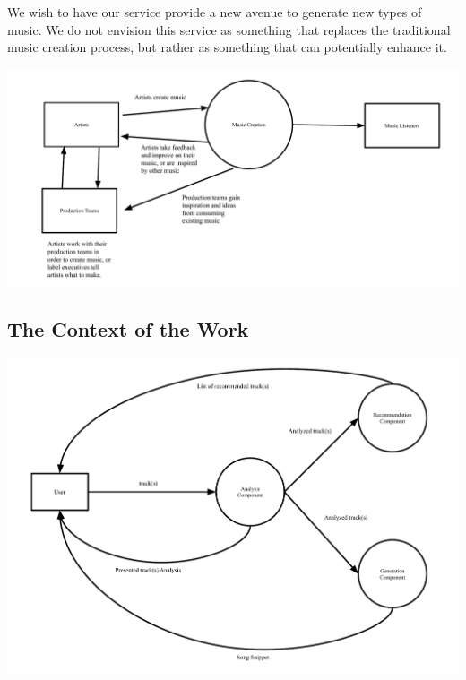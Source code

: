 \documentclass[12pt]{article}
\begin{document}
\begin{itemize}
  We wish to have our service provide a new avenue to generate new types of music. We do not envision this service as 
  something that replaces the traditional music creation process, but rather as something that can potentially enhance it. 

  \includegraphics[width=\textwidth]{6_1_c.pdf}

\end{itemize}

\subsection{The Context of the Work}
\includegraphics[width=\textwidth]{6_2_context_diagram.pdf}
\end{document}
